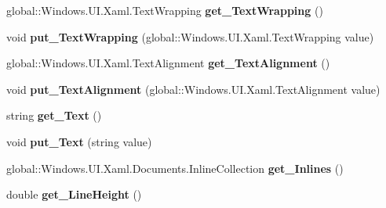 \begin{DoxyCompactItemize}
global\+::\+Windows.\+U\+I.\+Xaml.\+Text\+Wrapping {\bfseries get\+\_\+\+Text\+Wrapping} ()
\item 
\mbox{\label{class_windows_1_1_u_i_1_1_xaml_1_1_controls_1_1_text_block_ac924a5e979a26efc36bd609cb83b92d7}} 
void {\bfseries put\+\_\+\+Text\+Wrapping} (global\+::\+Windows.\+U\+I.\+Xaml.\+Text\+Wrapping value)
\item 
\mbox{\label{class_windows_1_1_u_i_1_1_xaml_1_1_controls_1_1_text_block_ac6b29ca491dedd9ebb342072b1916a79}} 
global\+::\+Windows.\+U\+I.\+Xaml.\+Text\+Alignment {\bfseries get\+\_\+\+Text\+Alignment} ()
\item 
\mbox{\label{class_windows_1_1_u_i_1_1_xaml_1_1_controls_1_1_text_block_a284f18b28cc583c43ba5d9187d561ef7}} 
void {\bfseries put\+\_\+\+Text\+Alignment} (global\+::\+Windows.\+U\+I.\+Xaml.\+Text\+Alignment value)
\item 
\mbox{\label{class_windows_1_1_u_i_1_1_xaml_1_1_controls_1_1_text_block_ae14b2c8d9da353fd995b80695d4caad0}} 
string {\bfseries get\+\_\+\+Text} ()
\item 
\mbox{\label{class_windows_1_1_u_i_1_1_xaml_1_1_controls_1_1_text_block_aa509823085f394729f1646a2acf564c4}} 
void {\bfseries put\+\_\+\+Text} (string value)
\item 
\mbox{\label{class_windows_1_1_u_i_1_1_xaml_1_1_controls_1_1_text_block_a6b2eb2ee12b7795ff5bfb850402083d6}} 
global\+::\+Windows.\+U\+I.\+Xaml.\+Documents.\+Inline\+Collection {\bfseries get\+\_\+\+Inlines} ()
\item 
\mbox{\label{class_windows_1_1_u_i_1_1_xaml_1_1_controls_1_1_text_block_a07976cf606fca5824f633f63d8da6936}} 
double {\bfseries get\+\_\+\+Line\+Height} ()
\item 
\mbox{\label{class_windows_1_1_u_i_1_1_xaml_1_1_controls_1_1_text_block_adbefe17b425b126a3b1d3598cf3b68f4}} 

\end{DoxyCompactItemize}
